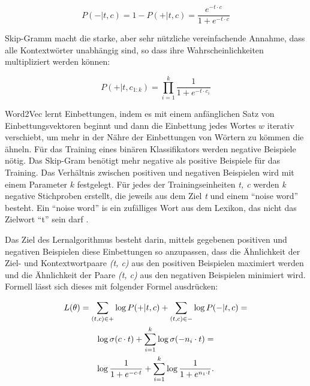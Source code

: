 \begin{equation} \label{Formel3_2}
    P(-|t,c) = 1-P(+|t,c) = \frac{e^{-t\cdot c}}{1+e^{-t\cdot c}}
\end{equation}

Skip-Gramm macht die starke, aber sehr nützliche vereinfachende Annahme, dass alle Kontextwörter unabhängig sind, so dass ihre Wahrscheinlichkeiten multipliziert werden können:

\begin{equation} \label{Formel3_3}
    P(+|t,c_{1:k}) = \prod ^{k}_{i=1}\frac{1}{1+e^{-t\cdot c_{i}}}
\end{equation}


Word2Vec lernt Einbettungen, indem es mit einem anfänglichen Satz von Einbettungsvektoren beginnt und dann die Einbettung jedes Wortes $w$ iterativ verschiebt, um mehr in der Nähre der Einbettungen von Wörtern zu kömmen die ähneln. Für das Training eines binären Klassifikators werden negative Beispiele nötig. Das Skip-Gram benötigt mehr negative als positive Beispiele für das Training. Das Verhältnis zwischen positiven und negativen Beispielen wird mit einem Parameter $k$ festgelegt. Für jedes der Trainingseinheiten \textit{t, c} werden \textit{k} negative Stichproben erstellt, die jeweils aus dem Ziel \textit{t} und einem \enquote{noise word} besteht. Ein \enquote{noise word} is ein zufälliges Wort aus dem Lexikon, das nicht das Zielwort \enquote{t} sein darf \cite*[113]{Jurafskya}.

Das Ziel des Lernalgorithmus besteht darin, mittels gegebenen positiven und negativen Beispielen diese Einbettungen so anzupassen, dass die Ähnlichkeit der Ziel- und Kontextwortpaare \textit{(t, c)} aus den positiven Beispielen maximiert werden und die Ähnlichkeit der Paare \textit{(t, c)} aus den negativen Beispielen minimiert wird. Formell lässt sich dieses mit folgender Formel ausdrücken:

\begin{gather} \label{Formel3_5}
    L(\theta) = \sum_{(t,c)\in +}\log P(+|t,c)+\sum_{(t,c)\in -} \log P(-|t,c) =  \notag\\
    \log \sigma(c \cdot t)+\sum^{k}_{i=1}\log \sigma(-n_{i} \cdot t) = \notag\\
    \log \frac{1}{1+e^{-c \cdot t}}+\sum^{k}_{i=1}\log\frac{1}{1+e^{n_{1} \cdot t}}.
\end{gather}

